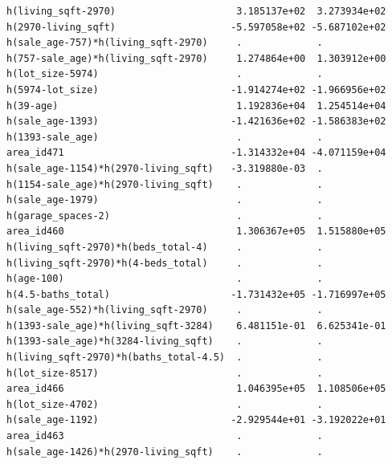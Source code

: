 \documentclass[
]{article}
\begin{document}
\begin{verbatim}
h(living_sqft-2970)                     3.185137e+02  3.273934e+02
h(2970-living_sqft)                    -5.597058e+02 -5.687102e+02
h(sale_age-757)*h(living_sqft-2970)     .             .           
h(757-sale_age)*h(living_sqft-2970)     1.274864e+00  1.303912e+00
h(lot_size-5974)                        .             .           
h(5974-lot_size)                       -1.914274e+02 -1.966956e+02
h(39-age)                               1.192836e+04  1.254514e+04
h(sale_age-1393)                       -1.421636e+02 -1.586383e+02
h(1393-sale_age)                        .             .           
area_id471                             -1.314332e+04 -4.071159e+04
h(sale_age-1154)*h(2970-living_sqft)   -3.319880e-03  .           
h(1154-sale_age)*h(2970-living_sqft)    .             .           
h(sale_age-1979)                        .             .           
h(garage_spaces-2)                      .             .           
area_id460                              1.306367e+05  1.515880e+05
h(living_sqft-2970)*h(beds_total-4)     .             .           
h(living_sqft-2970)*h(4-beds_total)     .             .           
h(age-100)                              .             .           
h(4.5-baths_total)                     -1.731432e+05 -1.716997e+05
h(sale_age-552)*h(living_sqft-2970)     .             .           
h(1393-sale_age)*h(living_sqft-3284)    6.481151e-01  6.625341e-01
h(1393-sale_age)*h(3284-living_sqft)    .             .           
h(living_sqft-2970)*h(baths_total-4.5)  .             .           
h(lot_size-8517)                        .             .           
area_id466                              1.046395e+05  1.108506e+05
h(lot_size-4702)                        .             .           
h(sale_age-1192)                       -2.929544e+01 -3.192022e+01
area_id463                              .             .           
h(sale_age-1426)*h(2970-living_sqft)    .             .           
                                                                  

\end{verbatim}
\end{document}
